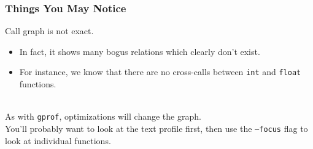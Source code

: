 \begin{frame}
  \frametitle{Things You May Notice}

  

\begin{changemargin}{1.5cm}
    Call graph is not exact.
    
      \begin{itemize}
        \item In fact, it shows many bogus relations which clearly don't exist.
        \item For instance, we know that there are no cross-calls between {\tt int} and {\tt float} functions.
      \end{itemize}~\\

    As with {\tt gprof}, optimizations will change the
      graph.\\[1em]

    You'll probably want to look at the text profile first, then use the
      {\tt --focus} flag to look at individual functions.
      \end{changemargin}
\end{frame}





